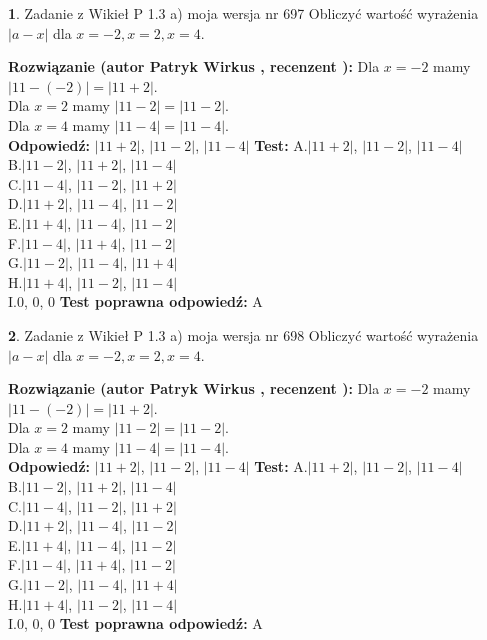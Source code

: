 \documentclass[12pt, a4paper]{article}
\theoremstyle{definition} %
\newtheorem{zad}{}
\newcommand{\zadStart}[1]{\begin{zad}#1\newline}
\newcommand{\zadStop}{\end{zad}}
\newcommand{\rozwStart}[2]{\noindent \textbf{Rozwiązanie (autor #1 , recenzent #2): }\newline}
\newcommand{\rozwStop}{\newline}
\newcommand{\odpStart}{\noindent \textbf{Odpowiedź:}\newline}
\newcommand{\odpStop}{\newline}
\newcommand{\testStart}{\noindent \textbf{Test:}\newline}
\newcommand{\testStop}{\newline}
\newcommand{\kluczStart}{\noindent \textbf{Test poprawna odpowiedź:}\newline}
\newcommand{\kluczStop}{\newline}
\begin{document}
\zadStart{Zadanie z Wikieł P 1.3 a) moja wersja nr 697}
Obliczyć wartość wyrażenia $|a - x|$ dla $x=-2,x=2,x=4$.
\zadStop
\rozwStart{Patryk Wirkus}{}
Dla $x = -2$ mamy $|11 - (-2)| = |11 + 2|$.\\
Dla $x = 2$ mamy $|11 - 2| = |11 - 2|$.\\
Dla $x = 4$ mamy $|11 - 4| = |11 - 4|$.\\
\rozwStop
\odpStart
$|11 + 2|$, $|11 - 2|$, $|11 - 4|$
\odpStop
\testStart
A.$|11 + 2|$, $|11 - 2|$, $|11 - 4|$\\
B.$|11 - 2|$, $|11 + 2|$, $|11 - 4|$\\
C.$|11 - 4|$, $|11 - 2|$, $|11 + 2|$\\
D.$|11 + 2|$, $|11 - 4|$, $|11 - 2|$\\
E.$|11 + 4|$, $|11 - 4|$, $|11 - 2|$\\
F.$|11 - 4|$, $|11 + 4|$, $|11 - 2|$\\
G.$|11 - 2|$, $|11 - 4|$, $|11 + 4|$\\
H.$|11 + 4|$, $|11 - 2|$, $|11 - 4|$\\
I.$0$, $0$, $0$
\testStop
\kluczStart
A
\kluczStop



\zadStart{Zadanie z Wikieł P 1.3 a) moja wersja nr 698}
Obliczyć wartość wyrażenia $|a - x|$ dla $x=-2,x=2,x=4$.
\zadStop
\rozwStart{Patryk Wirkus}{}
Dla $x = -2$ mamy $|11 - (-2)| = |11 + 2|$.\\
Dla $x = 2$ mamy $|11 - 2| = |11 - 2|$.\\
Dla $x = 4$ mamy $|11 - 4| = |11 - 4|$.\\
\rozwStop
\odpStart
$|11 + 2|$, $|11 - 2|$, $|11 - 4|$
\odpStop
\testStart
A.$|11 + 2|$, $|11 - 2|$, $|11 - 4|$\\
B.$|11 - 2|$, $|11 + 2|$, $|11 - 4|$\\
C.$|11 - 4|$, $|11 - 2|$, $|11 + 2|$\\
D.$|11 + 2|$, $|11 - 4|$, $|11 - 2|$\\
E.$|11 + 4|$, $|11 - 4|$, $|11 - 2|$\\
F.$|11 - 4|$, $|11 + 4|$, $|11 - 2|$\\
G.$|11 - 2|$, $|11 - 4|$, $|11 + 4|$\\
H.$|11 + 4|$, $|11 - 2|$, $|11 - 4|$\\
I.$0$, $0$, $0$
\testStop
\kluczStart
A
\kluczStop
\end{document}
